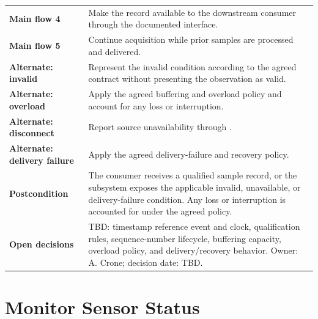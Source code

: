 \begin{tabularx}{\linewidth}{L{3.5cm}Y}
\textbf{Main flow 4} & Make the record available to the downstream consumer through the documented interface.\\
\textbf{Main flow 5} & Continue acquisition while prior samples are processed and delivered.\\
\textbf{Alternate: invalid} & Represent the invalid condition according to the agreed contract without presenting the observation as valid.\\
\textbf{Alternate: overload} & Apply the agreed buffering and overload policy and account for any loss or interruption.\\
\textbf{Alternate: disconnect} & Report source unavailability through .\\
\textbf{Alternate: delivery failure} & Apply the agreed delivery-failure and recovery policy.\\
\textbf{Postcondition} & The consumer receives a qualified sample record, or the subsystem exposes the applicable invalid, unavailable, or delivery-failure condition. Any loss or interruption is accounted for under the agreed policy.\\
\textbf{Open decisions} & TBD: timestamp reference event and clock, qualification rules, sequence-number lifecycle, buffering capacity, overload policy, and delivery/recovery behavior. Owner: A. Crone; decision date: TBD.\\
\end{tabularx}
\section{Monitor Sensor Status}

